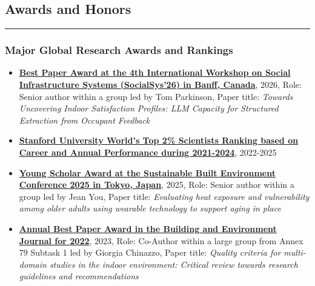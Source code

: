 \documentclass[10pt,a4paper]{article}
\begin{document}
\begin{small}

\subsection*{Awards and Honors}
\hrule
\vspace{0.2cm}

\subsubsection*{Major Global Research Awards and Rankings}

\begin{itemize}
  \item \textbf{\href{https://www.dropbox.com/scl/fi/n1ys28ftexukzlk58kjlm/SocialSys-BestPaperAward.jpeg?rlkey=1s6q5z9tllfwdn24c5mldw8wy&st=ui3e2q7q&dl=0}{Best Paper Award at the 4th International Workshop on Social Infrastructure Systems (SocialSys’26) in Banff, Canada}}, 2026, Role: Senior author within a group led by Tom Parkinson, Paper title: \emph{Towards Uncovering Indoor Satisfaction Profiles: LLM Capacity for Structured Extraction from Occupant Feedback}

  \item \textbf{\href{https://elsevier.digitalcommonsdata.com/datasets/btchxktzyw/8}{Stanford University World’s Top 2\% Scientists Ranking based on Career and Annual Performance during 2021-2024}}, 2022-2025 %

  \item \textbf{\href{https://www.dropbox.com/scl/fi/gc79x3r9zwjy2nzny4xw0/YoungScholarAward-sbe2025tokyo.pdf?rlkey=wd0b3sxv51u5rhdr2jg8fawdd&dl=0}{Young Scholar Award at the Sustainable Built Environment Conference 2025 in Tokyo, Japan}}, 2025, Role: Senior author within a group led by Jean You, Paper title: \emph{Evaluating heat exposure and vulnerability among older adults using wearable technology to support aging in place}
  

  \item \textbf{\href{https://vbn.aau.dk/en/prizes/2022-building-and-environment-best-paper-award}{Annual Best Paper Award in the Building and Environment Journal for 2022}}, 2023, Role: Co-Author within a large group from Annex 79 Subtask 1 led by Giorgia Chinazzo, Paper title: \emph{Quality criteria for multi-domain studies in the indoor environment: Critical review towards research guidelines and recommendations}%


\end{itemize}
\end{small}
\end{document}
